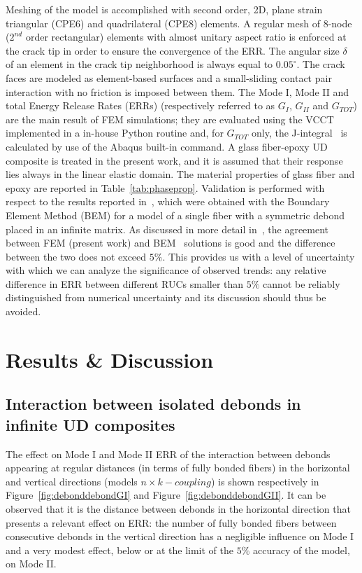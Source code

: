 \documentclass[review]{elsarticle}
\begin{document}
Meshing of the model is accomplished with second order, 2D, plane strain triangular (CPE6) and quadrilateral (CPE8) elements. A regular mesh of 8-node ($2^{nd}$ order rectangular) elements with almost unitary aspect ratio is enforced at the crack tip in order to ensure the convergence of the ERR. The angular size $\delta$ of an element in the crack tip neighborhood is always equal to $0.05^{\circ}$. The crack faces are modeled as element-based surfaces and a small-sliding contact pair interaction with no friction is imposed between them. The Mode I, Mode II and total Energy Release Rates (ERRs) (respectively referred to as $G_{I}$, $G_{II}$ and $G_{TOT}$) are the main result of FEM simulations; they are evaluated using the VCCT~\cite{Krueger2004} implemented in a in-house Python routine and, for $G_{TOT}$ only, the J-integral~\cite{Rice1968} is calculated by use of the Abaqus built-in command. A glass fiber-epoxy UD composite is treated in the present work, and it is assumed that their response lies always in the linear elastic domain. The material properties of glass fiber and epoxy are reported in Table~\ref{tab:phaseprop}. Validation is performed with respect to the results reported in~\cite{Paris2007,Sandino2016}, which were obtained with the Boundary Element Method (BEM) for a model of a single fiber with a symmetric debond placed in an infinite matrix. As discussed in more detail in~\cite{DiStasio2019}, the agreement between FEM (present work) and BEM~\cite{Paris2007,Sandino2016} solutions is good and the difference between the two does not exceed $5\%$. This provides us with a level of uncertainty with which we can analyze the significance of observed trends: any relative difference in ERR between different RUCs smaller than $5\%$ cannot be reliably distinguished from numerical uncertainty and its discussion should thus be avoided.

\section{Results \& Discussion}

\subsection{Interaction between isolated debonds in infinite UD composites}\label{subsec:chesstable}

The effect on Mode I and Mode II ERR of the interaction between debonds appearing at regular distances (in terms of fully bonded fibers) in the horizontal and vertical directions (models $n\times k-coupling$) is shown respectively in Figure~\ref{fig:debonddebondGI} and Figure~\ref{fig:debonddebondGII}. It can be observed that it is the distance between debonds in the horizontal direction that presents a relevant effect on ERR: the number of fully bonded fibers between consecutive debonds in the vertical direction has a negligible influence on Mode I and a very modest effect, below or at the limit of the $5\%$ accuracy of the model, on Mode II.
\end{document}
